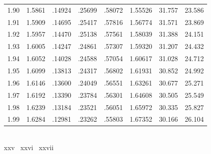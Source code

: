 \begin{minipage}{0.49\textwidth}
{\begin{tabular}{c|c|c|c|c|c|c|c}
        1.90 & 1.5861 & .14924 & .25699 & .58072 & 1.55526 & 31.757 & 23.586 \\
        1.91 & 1.5909 & .14695 & .25417 & .57816 & 1.56774 & 31.571 & 23.869 \\
        1.92 & 1.5957 & .14470 & .25138 & .57561 & 1.58039 & 31.388 & 24.151 \\
        1.93 & 1.6005 & .14247 & .24861 & .57307 & 1.59320 & 31.207 & 24.432 \\
        1.94 & 1.6052 & .14028 & .24588 & .57054 & 1.60617 & 31.028 & 24.712 \\
        1.95 & 1.6099 & .13813 & .24317 & .56802 & 1.61931 & 30.852 & 24.992 \\
        1.96 & 1.6146 & .13600 & .24049 & .56551 & 1.63261 & 30.677 & 25.271 \\
        1.97 & 1.6192 & .13390 & .23784 & .56301 & 1.64608 & 30.505 & 25.549 \\
        1.98 & 1.6239 & .13184 & .23521 & .56051 & 1.65972 & 30.335 & 25.827 \\
        1.99 & 1.6284 & .12981 & .23262 & .55803 & 1.67352 & 30.166 & 26.104 \\
    \end{tabular}
    }
\end{minipage} \\ \vspace{4mm}
{\color{TealBlue}xxv} \textbar\ {\color{Mulberry}xxvi} \textbar\ {\color{Orange}xxvii}

\newpage
